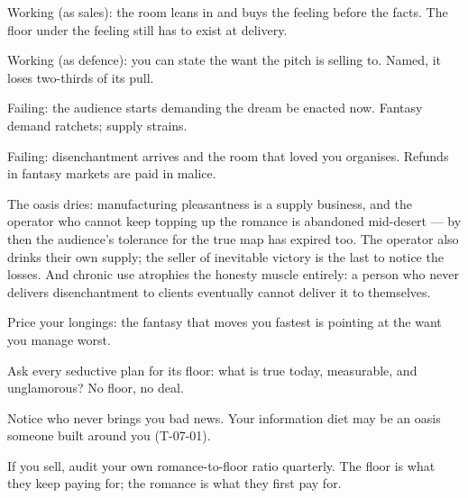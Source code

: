 \begin{feedback}
  \item Working (as sales): the room leans in and buys the feeling before the facts. The floor under the feeling still has to exist at delivery.
  \item Working (as defence): you can state the want the pitch is selling to. Named, it loses two-thirds of its pull.
  \item Failing: the audience starts demanding the dream be enacted now. Fantasy demand ratchets; supply strains.
  \item Failing: disenchantment arrives and the room that loved you organises. Refunds in fantasy markets are paid in malice.
\end{feedback}
\begin{failure}
The oasis dries: manufacturing pleasantness is a supply business, and the operator who cannot keep topping up the romance is abandoned mid-desert --- by then the audience's tolerance for the true map has expired too. The operator also drinks their own supply; the seller of inevitable victory is the last to notice the losses. And chronic use atrophies the honesty muscle entirely: a person who never delivers disenchantment to clients eventually cannot deliver it to themselves.
\end{failure}
\begin{countermeasures}
  \item Price your longings: the fantasy that moves you fastest is pointing at the want you manage worst.
  \item Ask every seductive plan for its floor: what is true today, measurable, and unglamorous? No floor, no deal.
  \item Notice who never brings you bad news. Your information diet may be an oasis someone built around you (T-07-01).
  \item If you sell, audit your own romance-to-floor ratio quarterly. The floor is what they keep paying for; the romance is what they first pay for.
\end{countermeasures}

\seesources
{}
